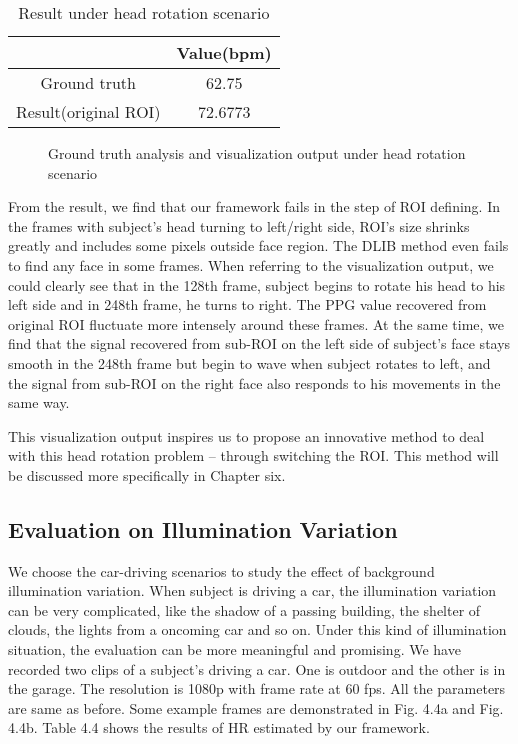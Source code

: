 \begin{table}[htbp]
\centering
\caption{Result under head rotation scenario} \label{tab:simpletable}
\begin{tabular}{|c|c|}
    \hline
     & Value(bpm) \\
    \hline
    Ground truth & 62.75 \\
    \hline
    Result(original ROI) & 72.6773 \\
    \hline
\end{tabular}
\end{table}


\begin{figure}[ht]
\hspace{-0.3in}
\caption{Ground truth analysis and visualization output under head rotation scenario}\label{fig:noted-figure}
\end{figure}



From the result, we find that our framework fails in the step of ROI defining. In the frames with subject’s head turning to left/right side, ROI's size shrinks greatly and includes some pixels outside face region. The DLIB method even fails to find any face in some frames. When referring to the visualization output, we could clearly see that in the 128th frame, subject begins to rotate his head to his left side and in 248th frame, he turns to right. The PPG value recovered from original ROI fluctuate more intensely around these frames. At the same time, we find that the signal recovered from sub-ROI on the left side of subject's face stays smooth in the 248th frame but begin to wave when subject rotates to left, and the signal from sub-ROI on the right face also responds to his movements in the same way. 

This visualization output inspires us to propose an innovative method to deal with this head rotation problem -- through switching the ROI. This method will be discussed more specifically in Chapter six.

\subsection{Evaluation on Illumination Variation}
We choose the car-driving scenarios to study the effect of background illumination variation. When subject is driving a car, the illumination variation can be very complicated, like the shadow of a passing building, the shelter of clouds, the lights from a oncoming car and so on. Under this kind of illumination situation, the evaluation can be more meaningful and promising. 
We have recorded two clips of a subject's driving a car. One is outdoor and the other is in the garage. The resolution is 1080p with frame rate at 60 fps. All the parameters are same as before. Some example frames are demonstrated in Fig. 4.4a and Fig. 4.4b. Table 4.4 shows the results of HR estimated by our framework.


